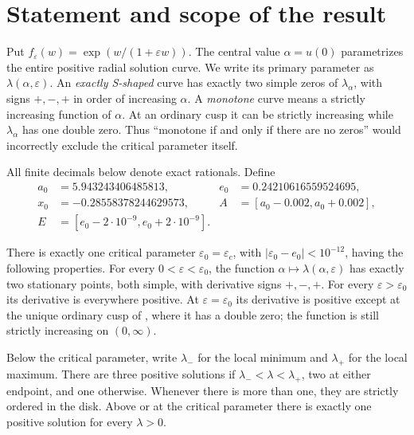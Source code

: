 \documentclass[11pt,a4paper]{report}
\begin{document}
\section{Statement and scope of the result}
Put $f_\varepsilon(w)=\exp(w/(1+\varepsilon w))$. The central value
$\alpha=u(0)$ parametrizes the entire positive radial solution curve.
We write its primary parameter as $\lambda(\alpha,\varepsilon)$.
An \emph{exactly S-shaped} curve has exactly two simple zeros of
$\lambda_\alpha$, with signs $+,-,+$ in order of increasing $\alpha$.
A \emph{monotone} curve means a strictly increasing function of $\alpha$.
At an ordinary cusp it can be strictly increasing while $\lambda_\alpha$ has
one double zero. Thus ``monotone if and only if there are no zeros'' would
incorrectly exclude the critical parameter itself.

All finite decimals below denote exact rationals. Define
\begin{align*}
 a_0&=5.943243406485813,& e_0&=0.24210616559524695,\\
 x_0&=-0.28558378244629573,&
 A&=[a_0-0.002,a_0+0.002],\\
 E&=[e_0-2\cdot10^{-9},e_0+2\cdot10^{-9}].
\end{align*}

\begin{theorem}\label{thm:global}
There is exactly one critical parameter $\varepsilon_0=\varepsilon_c$, with
$|\varepsilon_0-e_0|<10^{-12}$, having the following properties.
For every $0<\varepsilon<\varepsilon_0$, the function
$\alpha\mapsto\lambda(\alpha,\varepsilon)$ has exactly two stationary points,
both simple, with derivative signs $+,-,+$. For every
$\varepsilon>\varepsilon_0$ its derivative is everywhere positive.
At $\varepsilon=\varepsilon_0$ its derivative is positive except at the unique
ordinary cusp of , where it has a double zero; the function
is still strictly increasing on $(0,\infty)$.

Below the critical parameter, write $\lambda_-$ for the local minimum and
$\lambda_+$ for the local maximum. There are three positive solutions if
$\lambda_-<\lambda<\lambda_+$, two at either endpoint, and one otherwise.
Whenever there is more than one, they are strictly ordered in the disk.
Above or at the critical parameter there is exactly one positive solution
for every $\lambda>0$.
\end{theorem}
\end{document}
